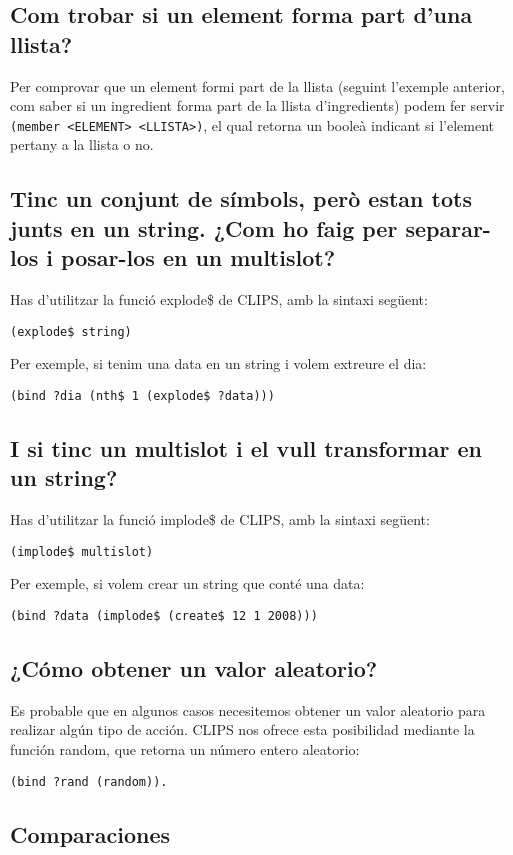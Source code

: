 \documentclass[11pt,svgnames]{scrbook}
\begin{document}
\subsection{Com trobar si un element forma part d'una llista?}


Per comprovar que un element formi part de la llista (seguint l'exemple
anterior, com saber si un ingredient forma part de la llista d'ingredients)
podem fer servir \texttt{(member <ELEMENT> <LLISTA>)}, el qual retorna un booleà
indicant si l'element pertany a la llista o no.


\subsection{Tinc un conjunt de símbols, però estan tots junts en un string. ¿Com
ho faig per
separar-los i posar-los en un multislot?}

Has d'utilitzar la funció explode\$ de CLIPS, amb la sintaxi següent:
\medskip

\texttt{(explode\$ string)}
\medskip

Per exemple, si tenim una data en un string i volem extreure el dia:
\medskip

\texttt{(bind ?dia (nth\$ 1 (explode\$ ?data)))}

\subsection{I si tinc un multislot i el vull transformar en un string?}

Has d'utilitzar la funció implode\$ de CLIPS, amb la sintaxi següent:
\medskip

\texttt{(implode\$ multislot)}
\medskip

Per exemple, si volem crear un string que conté una data:
\medskip

\texttt{(bind ?data (implode\$ (create\$ 12 1 2008)))}


\subsection{¿Cómo obtener un valor aleatorio?}

Es probable que en algunos casos necesitemos obtener un valor aleatorio para realizar algún tipo de acción. CLIPS nos ofrece esta posibilidad mediante la función random, que retorna un número entero aleatorio:
\medskip

\texttt{(bind ?rand (random)).}

\subsection{Comparaciones}
\end{document}
